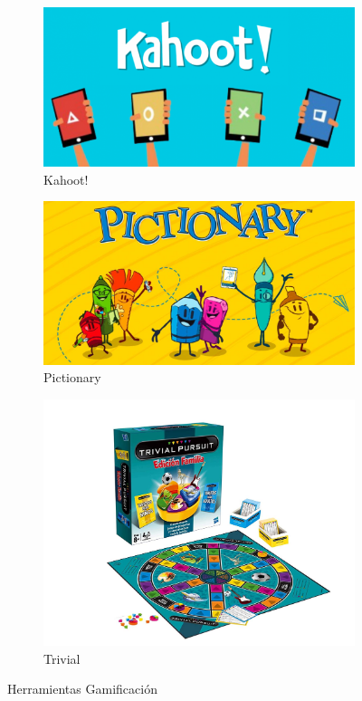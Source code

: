 \documentclass[spanish,12pt, a4paper,twoside]{paper}
\begin{document}
\begin{figure}[h]
    \centering
    \begin{subfigure}[b]{0.3\textwidth}
        \includegraphics[width=\textwidth]{recursos/kahoot.png}
        \caption{Kahoot!}
    \end{subfigure}
    \begin{subfigure}[b]{0.3\textwidth}
        \includegraphics[width=\textwidth]{recursos/pictionary-1200}
        \caption{Pictionary}
    \end{subfigure}
    \begin{subfigure}[b]{0.3\textwidth}
        \includegraphics[width=\textwidth]{recursos/trivial.jpg}
        \caption{Trivial}
    \end{subfigure}
    \caption{Herramientas Gamificación}
\end{figure}
\end{document}
